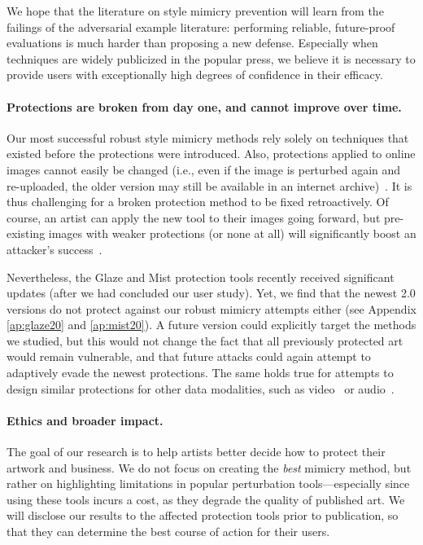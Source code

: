 \documentclass{article}
\begin{document}
We hope that the literature on style mimicry prevention will learn from the failings of the adversarial example literature:
performing reliable, future-proof evaluations is much harder than proposing a new defense.
Especially when techniques are widely publicized in the popular press, we believe it is necessary to provide users with exceptionally high degrees of confidence in their efficacy.

\paragraph{Protections are broken from day one, and cannot improve over time.}
Our most successful robust style mimicry methods rely solely on techniques that existed before the protections were introduced.
Also, protections applied to online images cannot easily be changed (i.e., even if the image is perturbed again and re-uploaded, the older version may still be available in an internet archive)~\citep{radiya2021data}.
It is thus challenging for a broken protection method to be fixed retroactively. Of course, an artist can apply the new tool to their images going forward, but pre-existing images with weaker protections (or none at all) will significantly boost an attacker's success~\citep{glaze}.

Nevertheless, the Glaze and Mist protection tools recently received significant updates (after we had concluded our user study). Yet, we find that the newest 2.0 versions do not protect against our robust mimicry attempts either (see Appendix \ref{ap:glaze20} and \ref{ap:mist20}).
A future version could explicitly target the methods we studied, but this would not change the fact that all previously protected art would remain vulnerable, and that future attacks could again attempt to adaptively evade the newest protections.
The same holds true for attempts to design similar protections for other data modalities, such as video~\citep{passananti2024disrupting} or audio~\citep{gokul2024poscuda}.

\paragraph{Ethics and broader impact.} The goal of our research is to help artists better decide how to protect their artwork and business. We do not focus on creating the \emph{best} mimicry method, but rather on highlighting limitations in popular perturbation tools---especially since using these tools incurs a cost, as they degrade the quality of published art.
We will disclose our results to the affected protection tools prior to publication, so that they can determine the best course of action for their users.
\end{document}
